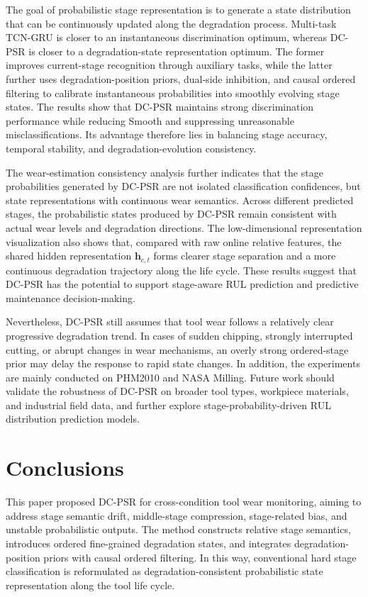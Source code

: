\documentclass[a4paper,fleqn]{cas-sc}
\begin{document}
  The goal of probabilistic stage representation is to generate a state distribution that can be continuously updated along the degradation process. Multi-task TCN-GRU is closer to an instantaneous discrimination optimum, whereas DC-PSR is closer to a degradation-state representation optimum. The former improves current-stage recognition through auxiliary tasks, while the latter further uses degradation-position priors, dual-side inhibition, and causal ordered filtering to calibrate instantaneous probabilities into smoothly evolving stage states. The results show that DC-PSR maintains strong discrimination performance while reducing Smooth and suppressing unreasonable misclassifications. Its advantage therefore lies in balancing stage accuracy, temporal stability, and degradation-evolution consistency.

  The wear-estimation consistency analysis further indicates that the stage probabilities generated by DC-PSR are not isolated classification confidences, but state representations with continuous wear semantics. Across different predicted stages, the probabilistic states produced by DC-PSR remain consistent with actual wear levels and degradation directions. The low-dimensional representation visualization also shows that, compared with raw online relative features, the shared hidden representation $\mathbf{h}_{c,t}$ forms clearer stage separation and a more continuous degradation trajectory along the life cycle. These results suggest that DC-PSR has the potential to support stage-aware RUL prediction and predictive maintenance decision-making.

  Nevertheless, DC-PSR still assumes that tool wear follows a relatively clear progressive degradation trend. In cases of sudden chipping, strongly interrupted cutting, or abrupt changes in wear mechanisms, an overly strong ordered-stage prior may delay the response to rapid state changes. In addition, the experiments are mainly conducted on PHM2010 and NASA Milling. Future work should validate the robustness of DC-PSR on broader tool types, workpiece materials, and industrial field data, and further explore stage-probability-driven RUL distribution prediction models.

  \section{Conclusions}
\label{sec:conclusions}
  This paper proposed DC-PSR for cross-condition tool wear monitoring, aiming to address stage semantic drift, middle-stage compression, stage-related bias, and unstable probabilistic outputs. The method constructs relative stage semantics, introduces ordered fine-grained degradation states, and integrates degradation-position priors with causal ordered filtering. In this way, conventional hard stage classification is reformulated as degradation-consistent probabilistic state representation along the tool life cycle.
\end{document}
